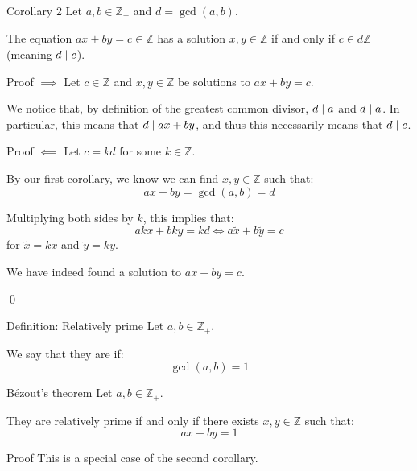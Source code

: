 \documentclass[a4paper]{article}
\begin{document}
\begin{parag}{Corollary 2}
    Let $a, b \in \mathbb{Z}_+$ and $d = \gcd\left(a, b\right)$.

    The equation $ax + by = c \in \mathbb{Z}$ has a solution $x, y \in \mathbb{Z}$ if and only if $c \in d \mathbb{Z}$ (meaning $d \mid c$).

    \begin{subparag}{Proof $\implies$}
        Let $c \in \mathbb{Z}$ and $x, y \in \mathbb{Z}$ be solutions to $ax + by = c$.

        We notice that, by definition of the greatest common divisor, $d \mid a$ and $d \mid a$. In particular, this means that $d \mid ax + by$, and thus this necessarily means that $d \mid c$.
    \end{subparag}

    \begin{subparag}{Proof $\impliedby$}
        Let $c = kd$ for some $k \in \mathbb{Z}$. 

        By our first corollary, we know we can find $x, y \in \mathbb{Z}$ such that: 
        \[ax + by = \gcd\left(a, b\right) = d\]

        Multiplying both sides by $k$, this implies that: 
        \[akx + bky = kd \iff a \widetilde{x} + b \widetilde{y} = c\]
        for $\widetilde{x} = kx$ and $\widetilde{y} = ky$.
        
        We have indeed found a solution to $ax + by = c$.

        \qed
    \end{subparag}
\end{parag}

\begin{parag}{Definition: Relatively prime}
    Let $a, b \in \mathbb{Z}_+$. 

    We say that they are  if: 
    \[\gcd\left(a, b\right) = 1\]
\end{parag}


\begin{parag}{Bézout's theorem}
    Let $a, b \in \mathbb{Z}_+$.

    They are relatively prime if and only if there exists $x, y \in \mathbb{Z}$ such that: 
    \[ax + by = 1\]
    
    \begin{subparag}{Proof}
        This is a special case of the second corollary.
    \end{subparag}
\end{parag}
\end{document}
